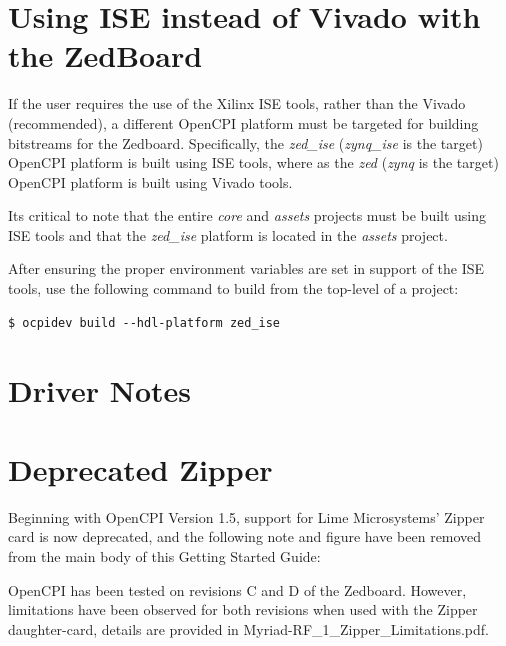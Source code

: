 \pagebreak
\begin{appendices}

\section{Using ISE instead of Vivado with the ZedBoard}
\begin{flushleft}
If the user requires the use of the Xilinx ISE tools, rather than the Vivado (recommended), a different OpenCPI platform must be targeted for building bitstreams for the Zedboard. Specifically, the \textit{zed\_ise} (\textit{zynq\_ise} is the target) OpenCPI platform is built using ISE tools, where as the \textit{zed} (\textit{zynq} is the target) OpenCPI platform  is built using Vivado tools.\medskip

Its critical to note that the entire \textit{core} and \textit{assets} projects must be built using ISE tools and that the \textit{zed\_ise} platform is located in the \textit{assets} project.\medskip

After ensuring the proper environment variables are set in support of the ISE tools, use the following command to build from the top-level of a project:

\begin{verbatim}
$ ocpidev build --hdl-platform zed_ise
\end{verbatim}
\end{flushleft}
\section{Driver Notes}

%
\section{Deprecated Zipper}
\begin{flushleft}
Beginning with OpenCPI Version 1.5, support for Lime Microsystems' Zipper card is now deprecated, and the following note and figure have been removed from the main body of this Getting Started Guide:\medskip

OpenCPI has been tested on revisions C and D of the Zedboard. However, limitations have been observed for both revisions when used with the Zipper daughter-card, details are provided in Myriad-RF\_1\_Zipper\_Limitations.pdf.
\end{flushleft}


\end{appendices}
